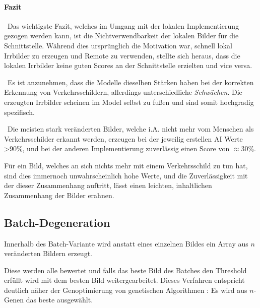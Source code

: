 \paragraph{Fazit}~\newline Das wichtigste Fazit, welches im Umgang mit der lokalen Implementierung gezogen werden kann, ist die Nichtverwendbarkeit der lokalen Bilder für die Schnittstelle. Während dies ursprünglich die Motivation war, schnell lokal Irrbilder zu erzeugen und Remote zu verwenden, stellte sich heraus, dass die lokalen Irrbilder keine guten Scores an der Schnittstelle erzielten und vice versa. 

~\newline Es ist anzunehmen, dass die Modelle dieselben Stärken haben bei der korrekten Erkennung von Verkehrsschildern, allerdings unterschiedliche \textit{Schwächen}. Die erzeugten Irrbilder scheinen im Model selbst zu fußen und sind somit hochgradig spezifisch. 

~\newline Die meisten stark veränderten Bilder, welche i.A. nicht mehr vom Menschen als Verkehrsschilder erkannt werden, erzeugen bei der jeweilig erstellen AI Werte >90\%, und bei der anderen Implementierung zuverlässig einen Score von $\approx$30\%. 

Für ein Bild, welches an sich nichts mehr mit einem Verkehrsschild zu tun hat, sind dies immernoch unwahrscheinlich hohe Werte, und die Zuverlässigkeit mit der dieser Zusammenhang auftritt, lässt einen leichten, inhaltlichen Zusammenhang der Bilder erahnen.

\newpage
\subsection{Batch-Degeneration}
Innerhalb des Batch-Variante wird anstatt eines einzelnen Bildes ein Array aus $n$ veränderten Bildern erzeugt. 

Diese werden alle bewertet und falls das beste Bild des Batches den Threshold erfüllt wird mit dem besten Bild weitergearbeitet. Dieses Verfahren entspricht deutlich näher der Genoptimierung von genetischen Algorithmen \cite{gerdes2013evolutionare}: Es wird aus $n$-Genen das beste ausgewählt. 

